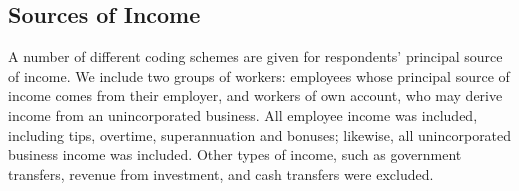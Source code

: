 \subsection{Sources of Income}

A number of different coding schemes are given for respondents' principal source of income. We include two groups of workers: employees whose principal source of income comes from their employer, and workers of own account, who may derive income from an unincorporated business. All employee income was included, including tips, overtime, superannuation and bonuses; likewise, all unincorporated business income was included. Other types of income, such as government transfers, revenue from investment, and cash transfers were excluded.

